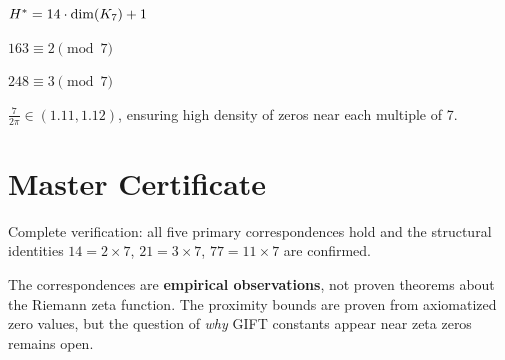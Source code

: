 \begin{theorem}[$\Hstar = 14 \times 7 + 1$]\label{thm:Hstar_7}
    \leanok
    $H^* = 14 \cdot \mathrm{dim}(K_7) + 1$
\end{theorem}

\begin{theorem}\label{thm:163_mod7}
    \leanok
    $163 \equiv 2 \pmod{7}$
\end{theorem}

\begin{theorem}\label{thm:248_mod7}
    \leanok
    $248 \equiv 3 \pmod{7}$
\end{theorem}

\begin{theorem}\label{thm:density_factor}
    \leanok
    $\frac{7}{2\pi} \in (1.11, 1.12)$, ensuring high density of zeros near
    each multiple of 7.
\end{theorem}

\section{Master Certificate}

\begin{theorem}\label{thm:zeta_cert}
    \leanok
    Complete verification: all five primary correspondences hold and
    the structural identities $14 = 2 \times 7$, $21 = 3 \times 7$,
    $77 = 11 \times 7$ are confirmed.
\end{theorem}

\begin{remark}
    The correspondences are \textbf{empirical observations}, not proven theorems
    about the Riemann zeta function. The proximity bounds are proven from
    axiomatized zero values, but the question of \emph{why} GIFT constants
    appear near zeta zeros remains open.
\end{remark}

